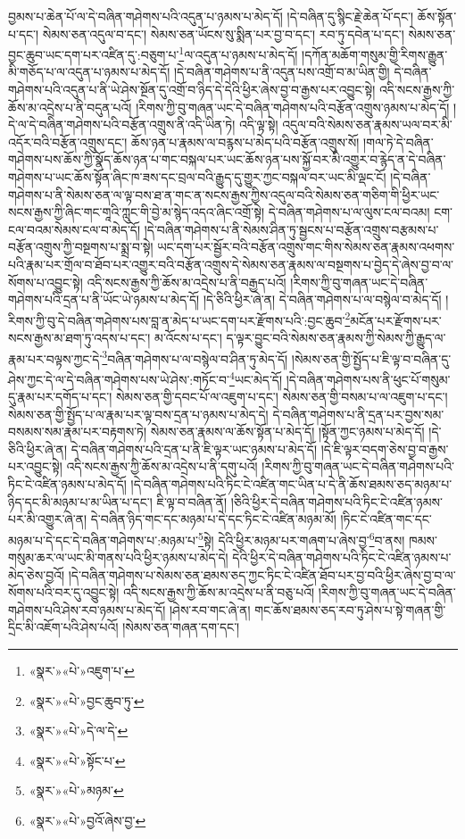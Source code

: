 བྱམས་པ་ཆེན་པོ་ལ་དེ་བཞིན་གཤེགས་པའི་འདུན་པ་ཉམས་པ་མེད་དོ། །དེ་བཞིན་དུ་སྙིང་རྗེ་ཆེན་པོ་དང་། ཆོས་སྟོན་པ་དང་། སེམས་ཅན་འདུལ་བ་དང་། སེམས་ཅན་ཡོངས་སུ་སྨིན་པར་བྱ་བ་དང་། རབ་ཏུ་དབེན་པ་དང་། སེམས་ཅན་བྱང་ཆུབ་ཡང་དག་པར་འཛིན་དུ་:བཅུག་པ་\footnote{«སྣར་»«པེ་»འཇུག་པ་}ལ་འདུན་པ་ཉམས་པ་མེད་དོ། །དཀོན་མཆོག་གསུམ་གྱི་རིགས་རྒྱུན་མི་གཅོད་པ་ལ་འདུན་པ་ཉམས་པ་མེད་དོ། །དེ་བཞིན་གཤེགས་པ་ནི་འདུན་པས་འགྲོ་བ་མ་ཡིན་གྱི། དེ་བཞིན་གཤེགས་པའི་འདུན་པ་ནི་ཡེ་ཤེས་སྔོན་དུ་འགྲོ་བ་ཉིད་དེ་དེའི་ཕྱིར་ཞེས་བྱ་བ་རྒྱས་པར་འབྱུང་སྟེ། འདི་སངས་རྒྱས་ཀྱི་ཆོས་མ་འདྲེས་པ་ནི་བདུན་པའོ། །རིགས་ཀྱི་བུ་གཞན་ཡང་དེ་བཞིན་གཤེགས་པའི་བརྩོན་འགྲུས་ཉམས་པ་མེད་དོ། །དེ་ལ་དེ་བཞིན་གཤེགས་པའི་བརྩོན་འགྲུས་ནི་འདི་ཡིན་ཏེ། འདི་ལྟ་སྟེ། འདུལ་བའི་སེམས་ཅན་རྣམས་ཡལ་བར་མི་འདོར་བའི་བརྩོན་འགྲུས་དང་། ཆོས་ཉན་པ་རྣམས་ལ་བརྙས་པ་མེད་པའི་བརྩོན་འགྲུས་སོ། །གལ་ཏེ་དེ་བཞིན་གཤེགས་པས་ཆོས་ཀྱི་སྣོད་ཆོས་ཉན་པ་གང་བསྐལ་པར་ཡང་ཆོས་ཉན་པས་སྐྱོ་བར་མི་འགྱུར་བ་རྙེད་ན་དེ་བཞིན་གཤེགས་པ་ཡང་ཆོས་སྟོན་ཞིང་ཁ་ཟས་དང་བྲལ་བའི་རྒྱུད་དུ་གྱུར་ཀྱང་བསྐལ་བར་ཡང་མི་ལྡང་ངོ། །དེ་བཞིན་གཤེགས་པ་ནི་སེམས་ཅན་ལ་ལྟ་བས་ཐ་ན་གང་ན་སངས་རྒྱས་ཀྱིས་འདུལ་བའི་སེམས་ཅན་གཅིག་གི་ཕྱིར་ཡང་སངས་རྒྱས་ཀྱི་ཞིང་གང་གཱའི་ཀླུང་གི་བྱེ་མ་སྙེད་འདའ་ཞིང་འགྲོ་སྟེ། དེ་བཞིན་གཤེགས་པ་ལ་ལུས་ངལ་བའམ། ངག་ངལ་བའམ་སེམས་ངལ་བ་མེད་དོ། །དེ་བཞིན་གཤེགས་པ་ནི་སེམས་ཤིན་ཏུ་སྦྱངས་པ་བརྩོན་འགྲུས་བརྩམས་པ་བརྩོན་འགྲུས་ཀྱི་བསྔགས་པ་སྨྲ་བ་སྟེ། ཡང་དག་པར་སྦྱོར་བའི་བརྩོན་འགྲུས་གང་གིས་སེམས་ཅན་རྣམས་འཕགས་པའི་རྣམ་པར་གྲོལ་བ་ཐོབ་པར་འགྱུར་བའི་བརྩོན་འགྲུས་དེ་སེམས་ཅན་རྣམས་ལ་བསྔགས་པ་བྱེད་དེ་ཞེས་བྱ་བ་ལ་སོགས་པ་འབྱུང་སྟེ། འདི་སངས་རྒྱས་ཀྱི་ཆོས་མ་འདྲེས་པ་ནི་བརྒྱད་པའོ། །རིགས་ཀྱི་བུ་གཞན་ཡང་དེ་བཞིན་གཤེགས་པའི་དྲན་པ་ནི་ཡོང་ཡེ་ཉམས་པ་མེད་དོ། །དེ་ཅིའི་ཕྱིར་ཞེ་ན། དེ་བཞིན་གཤེགས་པ་ལ་བསྙེལ་བ་མེད་དོ། །རིགས་ཀྱི་བུ་དེ་བཞིན་གཤེགས་པས་བླ་ན་མེད་པ་ཡང་དག་པར་རྫོགས་པའི་:བྱང་ཆུབ་\footnote{«སྣར་»«པེ་»བྱང་ཆུབ་ཏུ་}མངོན་པར་རྫོགས་པར་སངས་རྒྱས་མ་ཐག་ཏུ་འདས་པ་དང་། མ་འོངས་པ་དང་། ད་ལྟར་བྱུང་བའི་སེམས་ཅན་རྣམས་ཀྱི་སེམས་ཀྱི་རྒྱུད་ལ་རྣམ་པར་བལྟས་ཀྱང་དེ་\footnote{«སྣར་»«པེ་»དེ་ལ་དེ་}བཞིན་གཤེགས་པ་ལ་བསྙེལ་བ་ཤིན་ཏུ་མེད་དོ། །སེམས་ཅན་གྱི་སྤྱོད་པ་ཇི་ལྟ་བ་བཞིན་དུ་ཤེས་ཀྱང་དེ་ལ་དེ་བཞིན་གཤེགས་པས་ཡེ་ཤེས་:གཏོང་བ་\footnote{«སྣར་»«པེ་»སྟོང་པ་}ཡང་མེད་དོ། །དེ་བཞིན་གཤེགས་པས་ནི་ཕུང་པོ་གསུམ་དུ་རྣམ་པར་དགོད་པ་དང་། སེམས་ཅན་གྱི་དབང་པོ་ལ་འཇུག་པ་དང་། སེམས་ཅན་གྱི་བསམ་པ་ལ་འཇུག་པ་དང་། སེམས་ཅན་གྱི་སྤྱོད་པ་ལ་རྣམ་པར་ལྟ་བས་དྲན་པ་ཉམས་པ་མེད་དེ། དེ་བཞིན་གཤེགས་པ་ནི་དྲན་པར་བྱས་སམ་བསམས་སམ་རྣམ་པར་བརྟགས་ཏེ། སེམས་ཅན་རྣམས་ལ་ཆོས་སྟོན་པ་མེད་དོ། །སྟོན་ཀྱང་ཉམས་པ་མེད་དོ། །དེ་ཅིའི་ཕྱིར་ཞེ་ན། དེ་བཞིན་གཤེགས་པའི་དྲན་པ་ནི་ཇི་ལྟར་ཡང་ཉམས་པ་མེད་དོ། །དེ་ཇི་ལྟར་བདག་ཅེས་བྱ་བ་རྒྱས་པར་འབྱུང་སྟེ། འདི་སངས་རྒྱས་ཀྱི་ཆོས་མ་འདྲེས་པ་ནི་དགུ་པའོ། །རིགས་ཀྱི་བུ་གཞན་ཡང་དེ་བཞིན་གཤེགས་པའི་ཏིང་ངེ་འཛིན་ཉམས་པ་མེད་དོ། །དེ་བཞིན་གཤེགས་པའི་ཏིང་ངེ་འཛིན་གང་ཡིན་པ་དེ་ནི་ཆོས་ཐམས་ཅད་མཉམ་པ་ཉིད་དང་མི་མཉམ་པ་མ་ཡིན་པ་དང་། ཇི་ལྟ་བ་བཞིན་ནོ། །ཅིའི་ཕྱིར་དེ་བཞིན་གཤེགས་པའི་ཏིང་ངེ་འཛིན་ཉམས་པར་མི་འགྱུར་ཞེ་ན། དེ་བཞིན་ཉིད་གང་དང་མཉམ་པ་དེ་དང་ཏིང་ངེ་འཛིན་མཉམ་མོ། །ཏིང་ངེ་འཛིན་གང་དང་མཉམ་པ་དེ་དང་དེ་བཞིན་གཤེགས་པ་:མཉམ་པ་\footnote{«སྣར་»«པེ་»མཉམ་}སྟེ། དེའི་ཕྱིར་མཉམ་པར་གཞག་པ་ཞེས་བྱ་\footnote{«སྣར་»«པེ་»བྱའོ་ཞེས་བྱ་}བ་ནས། ཁམས་གསུམ་ཆར་ལ་ཡང་མི་གནས་པའི་ཕྱིར་ཉམས་པ་མེད་དེ། དེའི་ཕྱིར་དེ་བཞིན་གཤེགས་པའི་ཏིང་ངེ་འཛིན་ཉམས་པ་མེད་ཅེས་བྱའོ། །དེ་བཞིན་གཤེགས་པ་སེམས་ཅན་ཐམས་ཅད་ཀྱང་ཏིང་ངེ་འཛིན་ཐོབ་པར་བྱ་བའི་ཕྱིར་ཞེས་བྱ་བ་ལ་སོགས་པའི་བར་དུ་འབྱུང་སྟེ། འདི་སངས་རྒྱས་ཀྱི་ཆོས་མ་འདྲེས་པ་ནི་བཅུ་པའོ། །རིགས་ཀྱི་བུ་གཞན་ཡང་དེ་བཞིན་གཤེགས་པའི་ཤེས་རབ་ཉམས་པ་མེད་དོ། །ཤེས་རབ་གང་ཞེ་ན། གང་ཆོས་ཐམས་ཅད་རབ་ཏུ་ཤེས་པ་སྟེ་གཞན་གྱི་དྲིང་མི་འཇོག་པའི་ཤེས་པའོ། །སེམས་ཅན་གཞན་དག་དང་། 